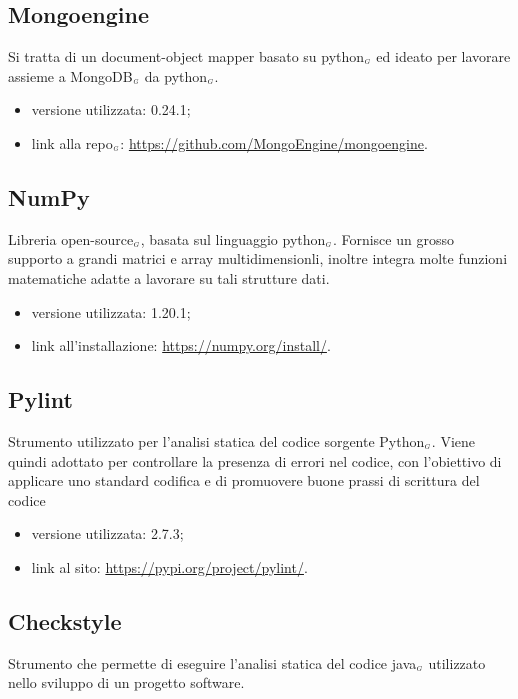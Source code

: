 \subsection{Mongoengine}\label{LibrerieMongoengine}
Si tratta di un document-object mapper basato su python$_{\scaleto{G}{3pt}}$ ed ideato per lavorare assieme a MongoDB$_{\scaleto{G}{3pt}}$ da python$_{\scaleto{G}{3pt}}$.

\begin{itemize}
  \item versione utilizzata: 0.24.1;
  \item link alla repo$_{\scaleto{G}{3pt}}$: \url{https://github.com/MongoEngine/mongoengine}.
\end{itemize}

\subsection{NumPy}\label{LibrerieNumpy}
Libreria open-source$_{\scaleto{G}{3pt}}$, basata sul linguaggio python$_{\scaleto{G}{3pt}}$.
Fornisce un grosso supporto a grandi matrici e array multidimensionli, inoltre integra molte funzioni matematiche adatte a lavorare su tali strutture dati.

\begin{itemize}
  \item versione utilizzata: 1.20.1;
  \item link all'installazione: \url{https://numpy.org/install/}.
\end{itemize}

\subsection{Pylint}\label{LibreriePylint}
Strumento utilizzato per l’analisi statica del codice sorgente Python$_{\scaleto{G}{3pt}}$. Viene quindi adottato per controllare la presenza di errori nel codice, con l’obiettivo di applicare uno standard codifica e di promuovere buone prassi di scrittura del codice

\begin{itemize}
  \item versione utilizzata: 2.7.3;
  \item link al sito: \url{https://pypi.org/project/pylint/}.
\end{itemize}

\subsection{Checkstyle}\label{LibrerieCheckstyle}
Strumento che permette di eseguire l’analisi statica del codice java$_{\scaleto{G}{3pt}}$ utilizzato nello sviluppo di un progetto software.

